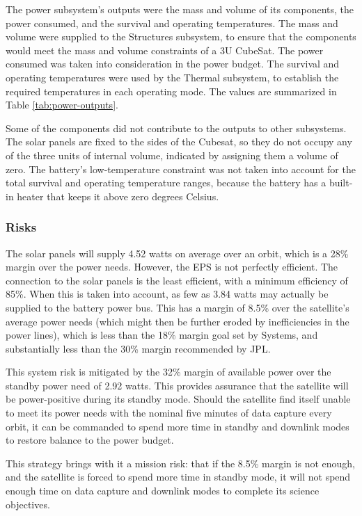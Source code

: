 \documentclass[12pt]{article}
\begin{document}
The power subsystem's outputs were the mass and volume of its components, the power consumed, and the survival and operating temperatures.  The mass and volume were supplied to the Structures subsystem, to ensure that the components would meet the mass and volume constraints of a 3U CubeSat.  The power consumed was taken into consideration in the power budget.  The survival and operating temperatures were used by the Thermal subsystem, to establish the required temperatures in each operating mode.  The values are summarized in Table \ref{tab:power-outputs}.

Some of the components did not contribute to the outputs to other subsystems.  The solar panels are fixed to the sides of the Cubesat, so they do not occupy any of the three units of internal volume, indicated by assigning them a volume of zero.  The battery's low-temperature constraint was not taken into account for the total survival and operating temperature ranges, because the battery has a built-in heater that keeps it above zero degrees Celsius.\cite[p.~12]{Battery-manual}

			\subsubsection{Risks}

The solar panels will supply 4.52 watts on average over an orbit, which is a 28\% margin over the power needs.  However, the EPS is not perfectly efficient.  The connection to the solar panels is the least efficient, with a minimum efficiency of 85\%\cite[p.~9]{EPS-manual}.  When this is taken into account, as few as 3.84 watts may actually be supplied to the battery power bus.  This has a margin of 8.5\% over the satellite's average power needs (which might then be further eroded by inefficiencies in the power lines), which is less than the 18\% margin goal set by Systems, and substantially less than the 30\% margin recommended by JPL.

This system risk is mitigated by the 32\% margin of available power over the standby power need of 2.92 watts.  This provides assurance that the satellite will be power-positive during its standby mode.  Should the satellite find itself unable to meet its power needs with the nominal five minutes of data capture every orbit, it can be commanded to spend more time in standby and downlink modes to restore balance to the power budget.

This strategy brings with it a mission risk: that if the 8.5\% margin is not enough, and the satellite is forced to spend more time in standby mode, it will not spend enough time on data capture and downlink modes to complete its science objectives.
\end{document}
